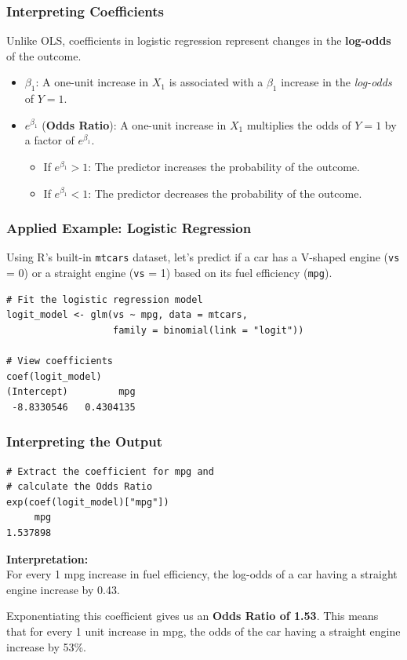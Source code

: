 \documentclass[10pt]{beamer} %
\begin{document}
\begin{frame}
    \frametitle{Interpreting Coefficients}
    Unlike OLS, coefficients in logistic regression represent changes in the \textbf{log-odds} of the outcome.
    
    \vspace{0.5cm}
    \begin{itemize}
        \item $\beta_1$: A one-unit increase in $X_1$ is associated with a $\beta_1$ increase in the \textit{log-odds} of $Y=1$.
        \item $e^{\beta_1}$ (\textbf{Odds Ratio}): A one-unit increase in $X_1$ multiplies the odds of $Y=1$ by a factor of $e^{\beta_1}$.
        \begin{itemize}
            \item If $e^{\beta_1} > 1$: The predictor increases the probability of the outcome.
            \item If $e^{\beta_1} < 1$: The predictor decreases the probability of the outcome.
        \end{itemize}
    \end{itemize}
\end{frame}

\begin{frame}[fragile]
    \frametitle{Applied Example: Logistic Regression}
    Using R's built-in \texttt{mtcars} dataset, let's predict if a car has a V-shaped engine (\texttt{vs} = 0) or a straight engine (\texttt{vs} = 1) based on its fuel efficiency (\texttt{mpg}).
    
\begin{verbatim}
# Fit the logistic regression model
logit_model <- glm(vs ~ mpg, data = mtcars, 
                   family = binomial(link = "logit"))

# View coefficients
coef(logit_model)
(Intercept)         mpg 
 -8.8330546   0.4304135 
\end{verbatim}
\end{frame}

\begin{frame}[fragile]
    \frametitle{Interpreting the Output}
\begin{verbatim}
# Extract the coefficient for mpg and 
# calculate the Odds Ratio
exp(coef(logit_model)["mpg"])
     mpg 
1.537898 
\end{verbatim}

    \vspace{0.5cm}
    \textbf{Interpretation:}\\ 
    For every 1 mpg increase in fuel efficiency, the log-odds of a car having a straight engine increase by 0.43.
    
    \vspace{0.3cm}
    Exponentiating this coefficient gives us an \textbf{Odds Ratio of 1.53}. This means that for every 1 unit increase in mpg, the odds of the car having a straight engine increase by 53\%.
\end{frame}
\end{document}
